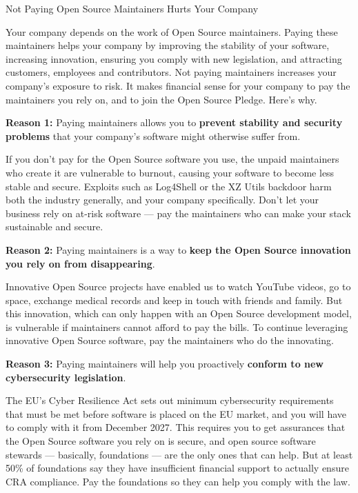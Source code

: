 



\begin{multicols}{2}



{\Huge Not Paying Open Source Maintainers Hurts Your Company}

Your company depends on the work of Open Source maintainers. Paying these maintainers helps your company by improving
the stability of your software, increasing innovation, ensuring you comply with new legislation, and attracting
customers, employees and contributors. Not paying maintainers increases your company's exposure to risk. It makes
financial sense for your company to pay the maintainers you rely on, and to join the Open Source Pledge. Here's why.

\textbf{Reason 1:} Paying maintainers allows you to \textbf{prevent stability and security problems} that your company's
software might otherwise suffer from.

If you don't pay for the Open Source software you use, the unpaid maintainers who create it are vulnerable to burnout,
causing your software to become less stable and secure. Exploits such as Log4Shell or the XZ Utils backdoor harm both
the industry generally, and your company specifically. Don't let your business rely on at-risk software — pay the
maintainers who can make your stack sustainable and secure.

\textbf{Reason 2:} Paying maintainers is a way to \textbf{keep the Open Source innovation you rely on from
disappearing}.

Innovative Open Source projects have enabled us to watch YouTube videos, go to space, exchange medical records and keep
in touch with friends and family. But this innovation, which can only happen with an Open Source development model, is
vulnerable if maintainers cannot afford to pay the bills. To continue leveraging innovative Open Source software, pay
the maintainers who do the innovating.

\textbf{Reason 3:} Paying maintainers will help you proactively \textbf{conform to new cybersecurity legislation}.

The EU's Cyber Resilience Act sets out minimum cybersecurity requirements that must be met before software is placed on
the EU market, and you will have to comply with it from December 2027. This requires you to get assurances that the Open
Source software you rely on is secure, and open source software stewards — basically, foundations — are the only ones
that can help. But at least 50\% of foundations say they have insufficient financial support to actually ensure CRA
compliance. Pay the foundations so they can help you comply with the law.


\end{multicols}
